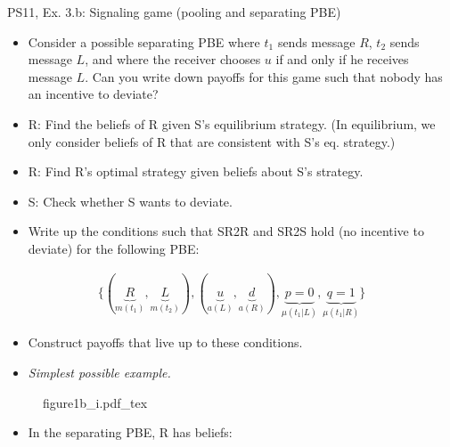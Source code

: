 \begin{frame}{PS11, Ex. 3.b: Signaling game (pooling and separating PBE)}
    \begin{itemize}
        \item[(b)] Consider a possible separating PBE where $t_1$ sends message $R$, $t_2$ sends message $L$, and where the receiver chooses $u$ if and only if he receives message $L$. Can you write down payoffs for this game such that nobody has an incentive to deviate?
    \end{itemize} \vspace{-8pt}
    \begin{multicols}{2}
      \begin{itemize}
        \item[SR3:] R: Find the beliefs of R given S's equilibrium strategy. (In equilibrium, we only consider beliefs of R that are consistent with S's eq. strategy.)
        \item[SR2R:] R: Find R's optimal strategy given beliefs about S's strategy.
        \item[SR2S:] S: Check whether S wants to deviate.
        \item[PBE:]  Write up the conditions such that SR2R and SR2S hold (no incentive to deviate) for the following PBE:
      \end{itemize}\vspace{-14pt}
      \begin{align*}
        \{(\underbrace{R}_{m(t_1)},\underbrace{L}_{m(t_2)}),(\underbrace{u}_{a(L)},\underbrace{d}_{a(R)}),\underbrace{p=0}_{\mu(t_1|L)},\underbrace{q=1}_{\mu(t_1|R)}\}
      \end{align*}\vspace{-12pt}
      \begin{itemize}
        \item[$\rightarrow$] Construct payoffs that live up to these conditions.
        \item[i:] \textit{Simplest possible example.}
      \end{itemize}
      \vfill\null\columnbreak
      \begin{figure}[!h]
        \center
        \def\svgwidth{1.1\columnwidth}
        {figure1b_i.pdf_tex}
      \end{figure} \vspace{-8pt}
      \begin{itemize}
        \item[SR3:] In the separating PBE, R has beliefs:\vspace{-10pt}

\end{itemize}
\end{multicols}
\end{frame}
